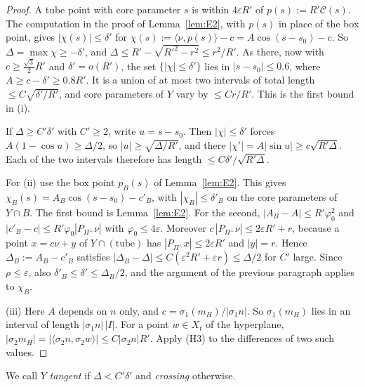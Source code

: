 \documentclass[aps,prx,twocolumn,superscriptaddress,nofootinbib,longbibliography]{revtex4-2}
\theoremstyle{plain}
\theoremstyle{definition}
\theoremstyle{remark}
\begin{document}
\begin{proof}
A tube point with core parameter $s$ is within $4\varepsilon R'$ of $p(s):=R'\mathcal C(s)$. The computation in the proof of Lemma~\ref{lem:E2}, with $p(s)$ in place of the box point, gives $|\chi(s)|\le\delta'$ for $\chi(s):=\langle\nu,p(s)\rangle-c=A\cos(s-s_0)-c$. So $\Delta=\max\chi\ge-\delta'$, and $\Delta\le R'-\sqrt{R'^2-r^2}\le r^2/R'$. As there, now with $c\ge\tfrac{\sqrt3}2R'$ and $\delta'=o(R')$, the set $\{|\chi|\le\delta'\}$ lies in $|s-s_0|\le0.6$, where $A\ge c-\delta'\ge0.8R'$. It is a union of at most two intervals of total length $\le C\sqrt{\delta'/R'}$, and core parameters of $Y$ vary by $\le Cr/R'$. This is the first bound in (i).

If $\Delta\ge C'\delta'$ with $C'\ge2$, write $u=s-s_0$. Then $|\chi|\le\delta'$ forces $A(1-\cos u)\ge\Delta/2$, so $|u|\ge\sqrt{\Delta/R'}$, and there $|\chi'|=A|\sin u|\ge c\sqrt{R'\Delta}$. Each of the two intervals therefore has length $\le C\delta'/\sqrt{R'\Delta}$.

For (ii) use the box point $p_B(s)$ of Lemma~\ref{lem:E2}. This gives $\chi_B(s)=A_B\cos(s-s_0)-c'_B$, with $|\chi_B|\le\delta'_B$ on the core parameters of $Y\cap B$. The first bound is Lemma~\ref{lem:E2}. For the second, $|A_B-A|\le R'\varphi_0^2$ and $|c'_B-c|\le R'\varphi_0|P_{\Pi^\perp}\nu|$ with $\varphi_0\le4\varepsilon$. Moreover $c\,|P_{\Pi^\perp}\nu|\le2\varepsilon R'+r$, because a point $x=c\nu+y$ of $Y\cap(\text{tube})$ has $|P_{\Pi^\perp}x|\le2\varepsilon R'$ and $|y|=r$. Hence $\Delta_B:=A_B-c'_B$ satisfies $|\Delta_B-\Delta|\le C(\varepsilon^2R'+\varepsilon r)\le\Delta/2$ for $C'$ large. Since $\rho\le\varepsilon$, also $\delta'_B\le\delta'\le\Delta_B/2$, and the argument of the previous paragraph applies to $\chi_B$.

(iii) Here $A$ depends on $n$ only, and $c=\sigma_1(m_H)/|\sigma_1n|$. So $\sigma_1(m_H)$ lies in an interval of length $|\sigma_1n|\,|I|$. For a point $w\in X_t$ of the hyperplane, $|\sigma_2m_H|=|\langle\sigma_2n,\sigma_2w\rangle|\le C|\sigma_2n|R'$. Apply (H3) to the differences of two such values.
\end{proof}
We call $Y$ \emph{tangent} if $\Delta<C'\delta'$ and \emph{crossing} otherwise.
\end{document}
